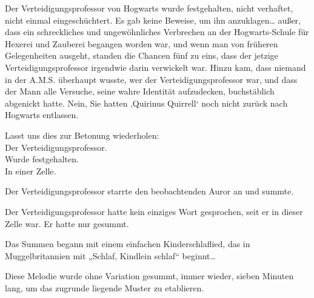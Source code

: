 Der Verteidigungsprofessor von Hogwarts wurde festgehalten, nicht verhaftet, nicht einmal eingeschüchtert. Es gab keine Beweise, um ihn anzuklagen… außer, dass ein schreckliches und ungewöhnliches Verbrechen an der Hogwarts-Schule für Hexerei und Zauberei begangen worden war, und wenn man von früheren Gelegenheiten ausgeht, standen die Chancen fünf zu eins, dass der jetzige Verteidigungsprofessor irgendwie darin verwickelt war. Hinzu kam, dass niemand in der A.M.S. überhaupt wusste, wer der Verteidigungsprofessor war, und dass der Mann alle Versuche, seine wahre Identität aufzudecken, buchstäblich abgenickt hatte.
Nein, Sie hatten ‚Quirinus Quirrell‘ noch nicht zurück nach Hogwarts entlassen.




Lasst uns dies zur Betonung wiederholen:\\
Der Verteidigungsprofessor.\\
Wurde festgehalten.\\
In einer Zelle.

Der Verteidigungsprofessor starrte den beobachtenden Auror an und summte.

Der Verteidigungsprofessor hatte kein einziges Wort gesprochen, seit er in dieser Zelle war. Er hatte nur gesummt.

Das Summen begann mit einem einfachen Kinderschlaflied, das in Muggelbritannien mit „Schlaf, Kindlein schlaf“ beginnt…

Diese Melodie wurde ohne Variation gesummt, immer wieder, sieben Minuten lang, um das zugrunde liegende Muster zu etablieren.

